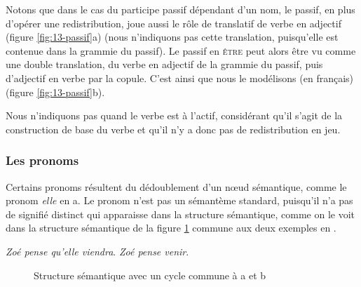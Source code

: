 Notons que dans le cas du participe passif dépendant d’un nom, le passif, en plus d’opérer une redistribution, joue aussi le rôle de translatif de verbe en adjectif (figure \ref{fig:13-passif}a) (nous n’indiquons pas cette translation, puisqu’elle est contenue dans la grammie du passif). Le passif en \textsc{être} peut alors être vu comme une double translation, du verbe en adjectif de la grammie du passif, puis d’adjectif en verbe par la copule. C’est ainsi que nous le modélisons (en français) (figure \ref{fig:13-passif}b).

Nous n’indiquons pas quand le verbe est à l’actif, considérant qu’il s’agit de la construction de base du verbe et qu’il n’y a donc pas de redistribution en jeu.

\subsubsection{Les pronoms}
Certains pronoms résultent du dédoublement d’un nœud sémantique, comme le pronom \textit{elle} en a. Le pronom n’est pas un sémantème standard, puisqu’il n’a pas de signifié distinct qui apparaisse dans la structure sémantique, comme on le voit dans la structure sémantique de la figure \ref{fig:13-pronom-sem} commune aux deux exemples en .

\ea\label{ex:13-pronom}
\ea \textit{Zoé pense qu’elle viendra}.
\ex \textit{Zoé pense venir}.\z\z

\begin{figure}
\caption{Structure sémantique avec un cycle commune à a et b \label{fig:13-pronom-sem}}
\end{figure}

